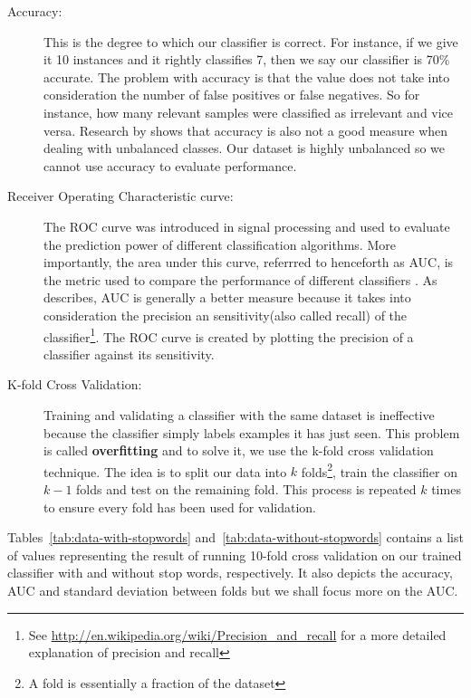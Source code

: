 \begin{description}
  \item[Accuracy:] This is the degree to which our classifier is correct. For instance, if we give
    it 10 instances and it rightly classifies 7, then we say our classifier is 70\% accurate. The
    problem with accuracy is that the value does not take into consideration the number of false
    positives or false negatives. So for instance, how many relevant samples were classified as
    irrelevant and vice versa. Research  by \citet{ling2003auc} shows that accuracy is also not a
    good measure when dealing with unbalanced classes. Our dataset is highly unbalanced so we cannot
    use accuracy to evaluate performance.

  \item[Receiver Operating Characteristic curve:] The ROC curve was introduced in signal processing
    and used to evaluate the prediction power of different classification algorithms. More
    importantly, the area under this curve, referrred to henceforth as AUC, is the metric used to
    compare the performance of different classifiers \citep{bradley1997use}. As \citet{ling2003auc,
    huang2005using} describes, AUC is generally a better measure because it takes into consideration
    the precision an sensitivity(also called recall) of the classifier\footnote{See
      \url{http://en.wikipedia.org/wiki/Precision_and_recall} for a more detailed explanation of
    precision and recall}. The ROC curve is created by plotting the precision of a classifier
    against its sensitivity.

  \item[K-fold Cross Validation:] Training and validating a classifier with the same dataset is
    ineffective because the classifier simply labels examples it has just seen. This problem is
    called \textbf{overfitting} and to solve it, we use the k-fold cross validation technique. The
    idea is to split our data into $k$ folds\footnote{A fold is essentially a fraction of the
    dataset}, train the classifier on $k-1$ folds and test on the remaining fold. This process is
    repeated $k$ times to ensure every fold has been used for validation.
\end{description}

Tables~\ref{tab:data-with-stopwords} and~\ref{tab:data-without-stopwords} contains a list of values
representing the result of running 10-fold cross validation on our trained classifier with and
without stop words, respectively. It also depicts the accuracy, AUC and standard deviation between
folds but we shall focus more on the AUC.

